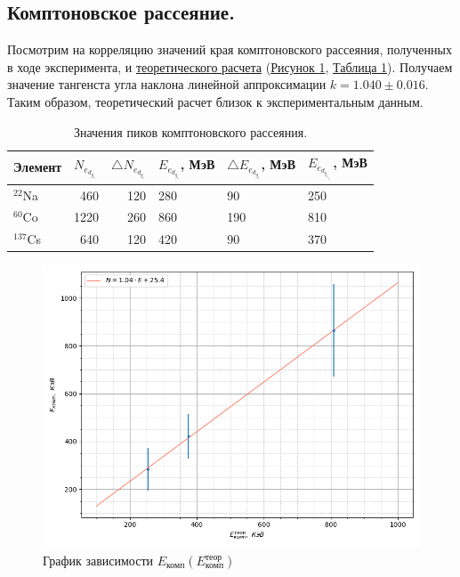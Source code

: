 \documentclass{article}
\begin{document}
\subsection{Комптоновское рассеяние.}
Посмотрим на корреляцию значений края комптоновского рассеяния, полученных в ходе эксперимента, и  \hyperref[E_compton]{теоретического расчета} (\hyperref[E(E)]{Рисунок \ref*{E(E)}}, \hyperref[compton]{Таблица \ref*{compton}}). Получаем значение тангенста угла наклона линейной аппроксимации $k = 1.040 \pm 0.016 $. Таким образом, теоретический расчет близок к экспериментальным данным.

\begin{table}[h!]
\centering
\begin{tabular}{|l|r|r|l|l|l|}
\hline
Элемент & \multicolumn{1}{l|}{$N_e_d_g_e$} & \multicolumn{1}{l|}{$\triangle N_e_d_g_e$} & $E_e_d_g_e$, МэВ & $\triangle E_e_d_g_e$, МэВ & $E_e_d_g_e_t_h_e_o_r$, МэВ \\ \hline
$^{22}$Na  & 460  & 120 & 280 & 90  & 250 \\ \hline
$^{60}$Co  & 1220 & 260 & 860 & 190 & 810 \\ \hline
$^{137}$Cs & 640  & 120 & 420 & 90  & 370 \\ \hline
\end{tabular}
\caption{Значения пиков комптоновского рассеяния.}
\label{compton}
\end{table}



 \begin{figure}[h!]
        \centering
        \includegraphics[width = 10 cm]{E(Etheor).png}
        \caption{График зависимости $E_{\text{комп}}(E_{\text{комп}}^{\text{теор}})$}
    \label{E(E)}
    \end{figure}

\end{document}
